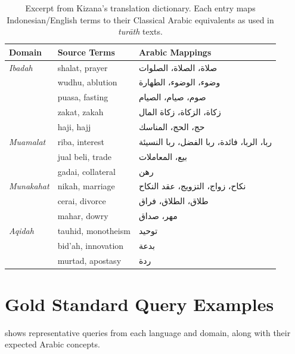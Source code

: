 \documentclass[preprint,12pt,authoryear]{elsarticle}
\newcommand{\ar}[1]{{\arabicfont #1}}
\newcommand{\ar}[1]{\textarabic{#1}}
\begin{document}
\begin{table}[t]
\centering
\caption{Excerpt from Kizana's translation dictionary. Each entry maps Indonesian/English terms to their Classical Arabic equivalents as used in \textit{tur\={a}th} texts.}
\label{tab:dict-excerpt}
\small
\begin{tabular}{llp{5cm}}
\toprule
Domain & Source Terms & Arabic Mappings \\
\midrule
\textit{Ibadah} & shalat, prayer & \ar{صلاة، الصلاة، الصلوات} \\
& wudhu, ablution & \ar{وضوء، الوضوء، الطهارة} \\
& puasa, fasting & \ar{صوم، صيام، الصيام} \\
& zakat, zakah & \ar{زكاة، الزكاة، زكاة المال} \\
& haji, hajj & \ar{حج، الحج، المناسك} \\
\midrule
\textit{Muamalat} & riba, interest & \ar{ربا، الربا، فائدة، ربا الفضل، ربا النسيئة} \\
& jual beli, trade & \ar{بيع، المعاملات} \\
& gadai, collateral & \ar{رهن} \\
\midrule
\textit{Munakahat} & nikah, marriage & \ar{نكاح، زواج، التزويج، عقد النكاح} \\
& cerai, divorce & \ar{طلاق، الطلاق، فراق} \\
& mahar, dowry & \ar{مهر، صداق} \\
\midrule
\textit{Aqidah} & tauhid, monotheism & \ar{توحيد} \\
& bid'ah, innovation & \ar{بدعة} \\
& murtad, apostasy & \ar{ردة} \\
\bottomrule
\end{tabular}
\end{table}

\section{Gold Standard Query Examples}
\label{appendix:queries}

 shows representative queries from each language and domain, along with their expected Arabic concepts.
\end{document}
